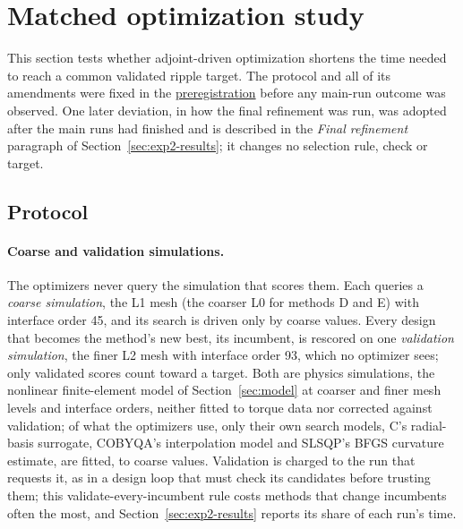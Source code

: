 \section{Matched optimization study}\label{sec:optimization}
This section tests whether adjoint-driven optimization shortens the time
needed to reach a common validated ripple target. The protocol and all of
its amendments were fixed in the
\href{https://github.com/rjwalters/geode-fem/issues/1185}{preregistration}
before any main-run outcome was observed. One later deviation, in how the
final refinement was run, was adopted after the main runs had finished and
is described in the \emph{Final refinement} paragraph of
Section~\ref{sec:exp2-results}; it changes no selection rule, check or
target.

\subsection{Protocol}
\paragraph{Coarse and validation simulations.}
The optimizers never query the simulation that scores them. Each queries a
\emph{coarse simulation}, the L1 mesh (the coarser L0 for methods D and E)
with interface order 45, and its search is driven only by coarse values.
Every design that becomes the method's new best, its incumbent, is rescored
on one \emph{validation simulation}, the finer L2 mesh with interface order
93, which no optimizer sees; only validated scores count toward a target.
Both are physics simulations, the nonlinear finite-element model of
Section~\ref{sec:model} at coarser and finer mesh levels and interface orders, neither
fitted to torque data nor corrected against validation; of what the
optimizers use, only their own search models, C's radial-basis surrogate,
COBYQA's interpolation model and SLSQP's BFGS curvature estimate, are
fitted, to coarse values.
Validation is charged to the run that requests it, as in a
design loop that must check its candidates before trusting them; this
validate-every-incumbent rule costs methods that change incumbents often
the most, and Section~\ref{sec:exp2-results} reports its share of each
run's time.

